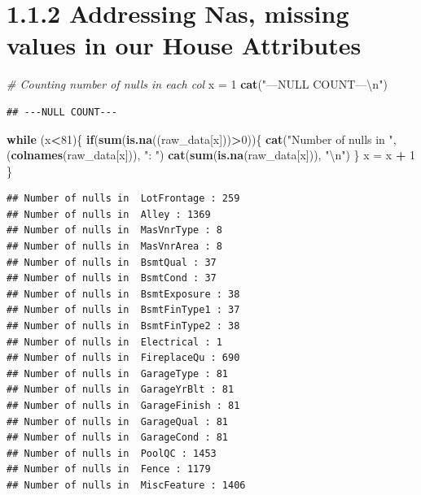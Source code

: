 \documentclass[]{article}
\newenvironment{Shaded}{\begin{snugshade}}{\end{snugshade}}
\newcommand{\KeywordTok}[1]{\textcolor[rgb]{0.13,0.29,0.53}{\textbf{#1}}}
\newcommand{\DecValTok}[1]{\textcolor[rgb]{0.00,0.00,0.81}{#1}}
\newcommand{\CharTok}[1]{\textcolor[rgb]{0.31,0.60,0.02}{#1}}
\newcommand{\StringTok}[1]{\textcolor[rgb]{0.31,0.60,0.02}{#1}}
\newcommand{\CommentTok}[1]{\textcolor[rgb]{0.56,0.35,0.01}{\textit{#1}}}
\newcommand{\ControlFlowTok}[1]{\textcolor[rgb]{0.13,0.29,0.53}{\textbf{#1}}}
\newcommand{\OperatorTok}[1]{\textcolor[rgb]{0.81,0.36,0.00}{\textbf{#1}}}
\newcommand{\NormalTok}[1]{#1}
\begin{document}
\section{1.1.2 Addressing Nas, missing values in our House
Attributes}\label{addressing-nas-missing-values-in-our-house-attributes}

\begin{Shaded}
\begin{Highlighting}[]
\CommentTok{# Counting number of nulls in each col}
\NormalTok{x =}\StringTok{ }\DecValTok{1}
\KeywordTok{cat}\NormalTok{(}\StringTok{"---NULL COUNT---}\CharTok{\textbackslash{}n}\StringTok{"}\NormalTok{)}
\end{Highlighting}
\end{Shaded}

\begin{verbatim}
## ---NULL COUNT---
\end{verbatim}

\begin{Shaded}
\begin{Highlighting}[]
\ControlFlowTok{while}\NormalTok{ (x}\OperatorTok{<}\DecValTok{81}\NormalTok{)\{}
  \ControlFlowTok{if}\NormalTok{(}\KeywordTok{sum}\NormalTok{(}\KeywordTok{is.na}\NormalTok{((raw_data[x]))}\OperatorTok{>}\DecValTok{0}\NormalTok{))\{}
    \KeywordTok{cat}\NormalTok{(}\StringTok{"Number of nulls in "}\NormalTok{,(}\KeywordTok{colnames}\NormalTok{(raw_data[x])), }\StringTok{": "}\NormalTok{)}
    \KeywordTok{cat}\NormalTok{(}\KeywordTok{sum}\NormalTok{(}\KeywordTok{is.na}\NormalTok{(raw_data[x])), }\StringTok{"}\CharTok{\textbackslash{}n}\StringTok{"}\NormalTok{)}
\NormalTok{  \}}
\NormalTok{  x =}\StringTok{ }\NormalTok{x }\OperatorTok{+}\StringTok{ }\DecValTok{1} 
\NormalTok{\}}
\end{Highlighting}
\end{Shaded}

\begin{verbatim}
## Number of nulls in  LotFrontage : 259 
## Number of nulls in  Alley : 1369 
## Number of nulls in  MasVnrType : 8 
## Number of nulls in  MasVnrArea : 8 
## Number of nulls in  BsmtQual : 37 
## Number of nulls in  BsmtCond : 37 
## Number of nulls in  BsmtExposure : 38 
## Number of nulls in  BsmtFinType1 : 37 
## Number of nulls in  BsmtFinType2 : 38 
## Number of nulls in  Electrical : 1 
## Number of nulls in  FireplaceQu : 690 
## Number of nulls in  GarageType : 81 
## Number of nulls in  GarageYrBlt : 81 
## Number of nulls in  GarageFinish : 81 
## Number of nulls in  GarageQual : 81 
## Number of nulls in  GarageCond : 81 
## Number of nulls in  PoolQC : 1453 
## Number of nulls in  Fence : 1179 
## Number of nulls in  MiscFeature : 1406
\end{verbatim}
\end{document}
